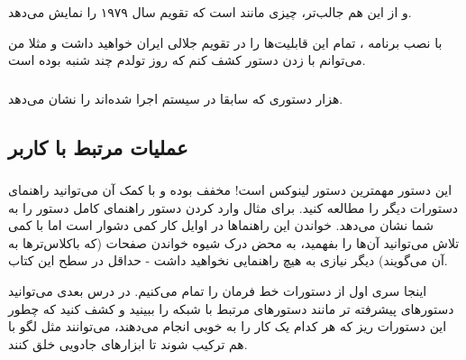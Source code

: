 و از این هم جالب‌تر، چیزی مانند
است که تقویم سال ۱۹۷۹ را نمایش می‌دهد.
\begin{mybox}
با نصب برنامه 
، تمام این قابلیت‌ها را در تقویم جلالی ایران خواهید داشت و مثلا من می‌توانم با زدن دستور 
 کشف کنم که روز تولدم چند شنبه بوده است.
\end{mybox}
\subsubsection*{}
هزار دستوری که سابقا در سیستم اجرا شده‌اند را نشان می‌دهد.

\subsection*{عملیات مرتبط با کاربر}
\subsubsection*{
}
این دستور مهمترین دستور لینوکس است! مخفف 
 بوده و با کمک آن می‌توانید راهنمای دستورات دیگر را مطالعه کنید. برای مثال وارد کردن دستور 
 راهنمای کامل دستور  را به شما نشان می‌دهد. خواندن این راهنماها در اوایل کار کمی دشوار است اما با کمی تلاش می‌توانید آن‌ها را بفهمید، به محض درک شیوه خواندن صفحات 
 (که باکلاس‌ترها به آن‌ 
 می‌گویند) دیگر نیازی به هیچ راهنمایی نخواهید داشت - حداقل در سطح این کتاب.

اینجا سری اول از دستورات خط فرمان را تمام می‌کنیم. در درس بعدی می‌توانید دستورهای پیشرفته تر مانند دستورهای مرتبط با شبکه را ببینید و کشف کنید که چطور این دستورات ریز که هر کدام یک کار را به خوبی انجام می‌دهند، می‌توانند مثل لگو با هم ترکیب شوند تا ابزارهای جادویی خلق کنند.
